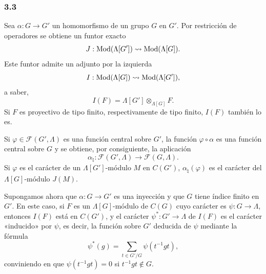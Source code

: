 \subsubsection*{3.3}

Sea $\alpha:G\to G'$ un homomorfismo de un grupo $G$ en $G'$. Por restricción de operadores se obtiene un funtor exacto
\[
J:\operatorname{Mod}(\Lambda[G'])\rightsquigarrow\operatorname{Mod}(\Lambda[G]).
\]
Este funtor admite un adjunto por la izquierda
\[
I:\operatorname{Mod}(\Lambda[G])\rightsquigarrow\operatorname{Mod}(\Lambda[G']),
\]
a saber,
\[
I(F)=\Lambda[G']\otimes_{\Lambda[G]}F.
\]
Si $F$ es proyectivo de tipo finito, respectivamente de tipo finito, $I(F)$ también lo es.

Si $\varphi\in\mathcal F(G',\Lambda)$ es una función central sobre $G'$, la función $\varphi\circ\alpha$ es una función central sobre $G$ y se obtiene, por consiguiente, la aplicación
\[
\alpha_\natural: \mathcal F(G',\Lambda)\longrightarrow\mathcal F(G,\Lambda).
\]
Si $\varphi$ es el carácter de un $\Lambda[G']$-módulo $M$ en $C(G')$, $\alpha_\natural(\varphi)$ es el carácter del $\Lambda[G]$-módulo $J(M)$.

Supongamos ahora que $\alpha:G\to G'$ es una inyección y que $G$ tiene índice finito en $G'$. En este caso, si $F$ es un $\Lambda[G]$-módulo de $C(G)$ cuyo carácter es $\psi:G\to\Lambda$, entonces $I(F)$ está en $C(G')$, y el carácter $\psi^*:G'\to\Lambda$ de $I(F)$ es el carácter «inducido» por $\psi$, es decir, la función sobre $G'$ deducida de $\psi$ mediante la fórmula
\[
\psi^*(g)=\sum_{t\in G'/G}\psi(t^{-1}gt),
\tag{3.3.1}
\]
conviniendo en que $\psi(t^{-1}gt)=0$ si $t^{-1}gt\notin G$.
